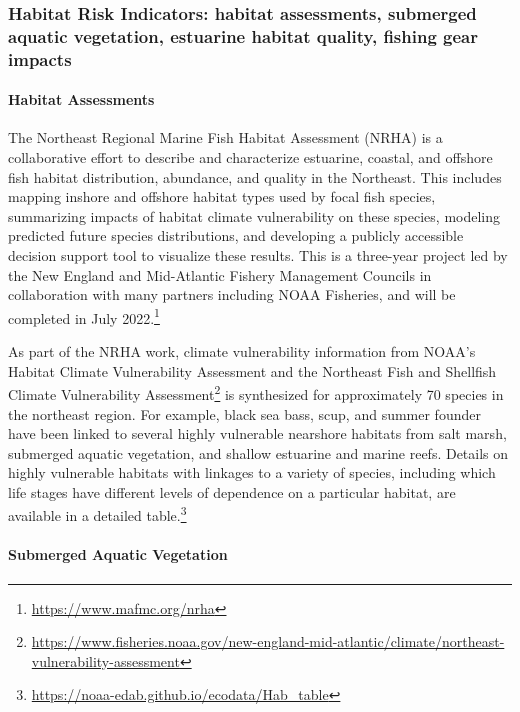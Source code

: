 \documentclass[
  10pt,
]{article}
\begin{document}
\hypertarget{habitat-risk-indicators-habitat-assessments-submerged-aquatic-vegetation-estuarine-habitat-quality-fishing-gear-impacts}{%
\subsubsection{Habitat Risk Indicators: habitat assessments, submerged
aquatic vegetation, estuarine habitat quality, fishing gear
impacts}\label{habitat-risk-indicators-habitat-assessments-submerged-aquatic-vegetation-estuarine-habitat-quality-fishing-gear-impacts}}

\hypertarget{habitat-assessments}{%
\paragraph{Habitat Assessments}\label{habitat-assessments}}

The Northeast Regional Marine Fish Habitat Assessment (NRHA) is a
collaborative effort to describe and characterize estuarine, coastal,
and offshore fish habitat distribution, abundance, and quality in the
Northeast. This includes mapping inshore and offshore habitat types used
by focal fish species, summarizing impacts of habitat climate
vulnerability on these species, modeling predicted future species
distributions, and developing a publicly accessible decision support
tool to visualize these results. This is a three-year project led by the
New England and Mid-Atlantic Fishery Management Councils in
collaboration with many partners including NOAA Fisheries, and will be
completed in July 2022.\footnote{\url{https://www.mafmc.org/nrha}}

As part of the NRHA work, climate vulnerability information from NOAA's
Habitat Climate Vulnerability Assessment and the Northeast Fish and
Shellfish Climate Vulnerability Assessment\footnote{\url{https://www.fisheries.noaa.gov/new-england-mid-atlantic/climate/northeast-vulnerability-assessment}}
is synthesized for approximately 70 species in the northeast region. For
example, black sea bass, scup, and summer founder have been linked to
several highly vulnerable nearshore habitats from salt marsh, submerged
aquatic vegetation, and shallow estuarine and marine reefs. Details on
highly vulnerable habitats with linkages to a variety of species,
including which life stages have different levels of dependence on a
particular habitat, are available in a detailed table.\footnote{\url{https://noaa-edab.github.io/ecodata/Hab_table}}

\hypertarget{submerged-aquatic-vegetation}{%
\paragraph{Submerged Aquatic
Vegetation}\label{submerged-aquatic-vegetation}}
\end{document}
